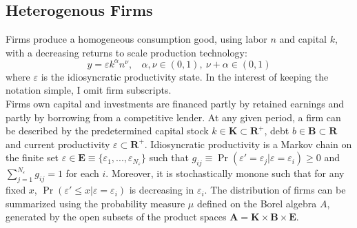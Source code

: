 \documentclass[12pt]{article}
\begin{document}
\subsection{Heterogenous Firms \label{sec:firms}}
Firms produce a homogeneous consumption good, using labor $n$ and capital $k$, with a decreasing returns to scale production technology:
\begin{equation} \label{eq:prodf}
y = \varepsilon k^{\alpha}n^{\nu}, \ \ \ \ \alpha,\nu \in (0,1),  \ \nu + \alpha \in (0,1)
\end{equation}  
where $\varepsilon$ is the idiosyncratic productivity state. In the interest of keeping the notation simple, I omit firm subscripts. \vspace{3mm} \\
Firms own capital and investments are financed partly by retained earnings and partly by borrowing from a competitive lender. At any given period, a firm can be described by the predetermined capital stock $k \in \mathbf{K} \subset \mathbf{R^{+}}$, debt $b \in \mathbf{B} \subset \mathbf{R}$ and current productivity $\varepsilon \subset \mathbf{R^+}$.  Idiosyncratic productivity is a Markov chain on the finite set $\varepsilon \in \mathbf{E} \equiv \{ \varepsilon_1,...,\varepsilon_{N_{\varepsilon}} \}$ such that $ g_{ij} \equiv \Pr(\varepsilon'= \varepsilon_j|\varepsilon = \varepsilon_i) \geq 0$ and $\sum_{j=1}^{N_{\varepsilon}} g_{ij} = 1$ for each $i$. Moreover, it is stochastically monone such that for any fixed $x$, $\Pr(\varepsilon' \leq x | \varepsilon = \varepsilon_i)$ is decreasing in $\varepsilon_i$. The distribution of firms can be summarized using the probability measure $\mu$ defined on the Borel algebra $A$, generated by the open subsets of the product spaces $ \mathbf{A} = \mathbf{K} \times \mathbf{B} \times \mathbf{E} $.
\end{document}
